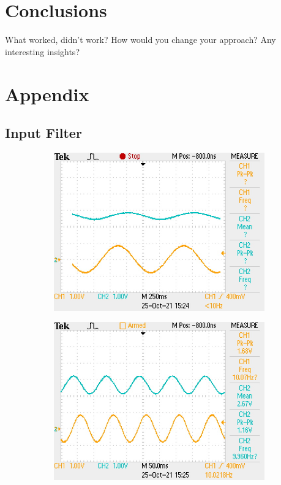 \documentclass[a4paper,11pt]{article}
\begin{document}
\section{Conclusions}

What worked, didn’t work? How would you change your approach? Any interesting insights?

\clearpage
\section*{Appendix}
\subsection*{Input Filter}
\begin{figure}[h!]
  \centering
  \begin{subfigure}{0.3\textwidth}
    \includegraphics[width=\columnwidth]{input_filter/input_1Hz.JPG}
  \end{subfigure}
  \begin{subfigure}{0.3\textwidth}
    \includegraphics[width=\columnwidth]{input_filter/input_10Hz.JPG}

\end{subfigure}
\end{figure}
\end{document}
